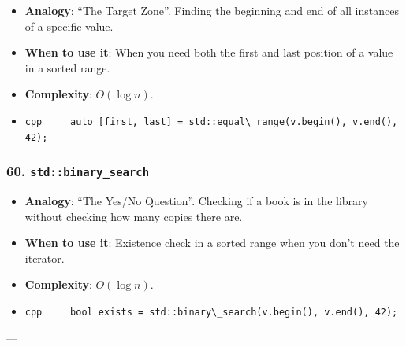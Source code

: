 \begin{itemize}
\tightlist
\item
  \textbf{Analogy}: ``The Target Zone''. Finding the beginning and end
  of all instances of a specific value.
\item
  \textbf{When to use it}: When you need both the first and last
  position of a value in a sorted range.
\item
  \textbf{Complexity}: \(O(\log n)\).
\item
  \passthrough{\lstinline!cpp     auto [first, last] = std::equal\_range(v.begin(), v.end(), 42);!}
\end{itemize}

\hypertarget{stdbinary_search}{%
\subsubsection{\texorpdfstring{60.
\texttt{std::binary\_search}}{60. std::binary\_search}}\label{stdbinary_search}}

\begin{itemize}
\tightlist
\item
  \textbf{Analogy}: ``The Yes/No Question''. Checking if a book is in
  the library without checking how many copies there are.
\item
  \textbf{When to use it}: Existence check in a sorted range when you
  don't need the iterator.
\item
  \textbf{Complexity}: \(O(\log n)\).
\item
  \passthrough{\lstinline!cpp     bool exists = std::binary\_search(v.begin(), v.end(), 42);!}
\end{itemize}

---\n
